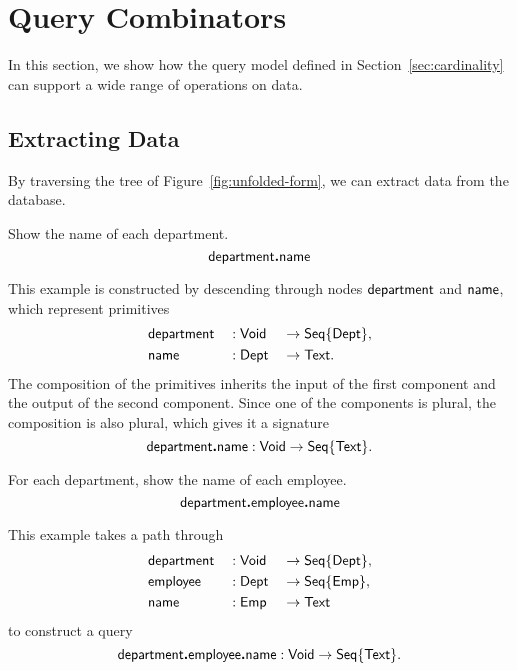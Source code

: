 
\section{Query Combinators}
\label{sec:combinators}

In this section, we show how the query model defined in
Section~\ref{sec:cardinality} can support a wide range of operations on data.

\subsection*{Extracting Data}

By traversing the tree of Figure~\ref{fig:unfolded-form}, we can extract data
from the database.

\begin{demo}
    \label{ex:department-name}
    Show the name of each department.
    \begin{equation*}
        \mathsf{department}\boldsymbol{.}\mathsf{name}
    \end{equation*}
\end{demo}

This example is constructed by descending through nodes $\mathsf{department}$ and
$\mathsf{name}$, which represent primitives
\begin{alignat*}{3}
    & \mathsf{department} && : \mathsf{Void} && \to \mathsf{Seq}{\left\{\mathsf{Dept}\right\}}, \\
    & \mathsf{name} && : \mathsf{Dept} && \to \mathsf{Text}.
\end{alignat*}
The composition of the primitives inherits the input of the first component and
the output of the second component.  Since one of the components is plural, the
composition is also plural, which gives it a signature
\begin{equation*}
    \mathsf{department}\boldsymbol{.}\mathsf{name} : \mathsf{Void} \to \mathsf{Seq}{\left\{\mathsf{Text}\right\}}.
\end{equation*}

\begin{demo}
    \label{ex:department-employee-name}
    For each department, show the name of each employee.
    \begin{equation*}
        \mathsf{department}\boldsymbol{.}\mathsf{employee}\boldsymbol{.}\mathsf{name}
    \end{equation*}
\end{demo}

This example takes a path through
\begin{alignat*}{3}
    & \mathsf{department} && : \mathsf{Void} && \to \mathsf{Seq}{\left\{\mathsf{Dept}\right\}}, \\
    & \mathsf{employee} && : \mathsf{Dept} && \to \mathsf{Seq}{\left\{\mathsf{Emp}\right\}}, \\
    & \mathsf{name} && : \mathsf{Emp} && \to \mathsf{Text}
\end{alignat*}
to construct a query
\begin{equation*}
    \mathsf{department}\boldsymbol{.}\mathsf{employee}\boldsymbol{.}\mathsf{name} : \mathsf{Void} \to \mathsf{Seq}{\left\{\mathsf{Text}\right\}}.
\end{equation*}

